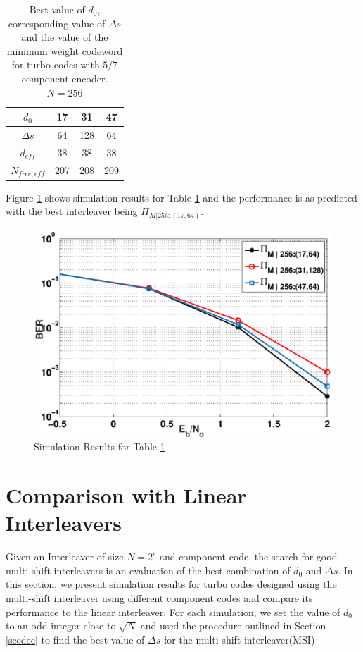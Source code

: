 \documentclass[a4paper, 12pt, oneside, openary]{jbook}
\begin{document}
 \begin{table}[h!]
\centering
\begin{tabular}{||c |c |c |c||} 
 \hline
 $d_0$ & 17 & 31 & 47 \\ [0.5ex] 
 \hline\hline
 $\Delta s$ & 64 & 128 & 64 \\ 
 \hline
  $d_{eff}$ & 38 & 38 & 38 \\ 
  \hline
  $N_{free, eff}$ & 207 & 208 & 209 \\ [1ex] 
 \hline
\end{tabular}
\caption{Best value of $d_0$,  corresponding value of $\Delta s$ 
and the value of the minimum weight codeword for
 turbo codes with $5/7$ component encoder. $N=256$}
\label{tab1}
\end{table}
Figure \ref{comp1} shows simulation results for Table 
 \ref{tab1} and the performance is as predicted with the best interleaver being $\Pi_{\mathit{M}|{256:(17,64)}}$.
\begin{figure}[h!]
\centering
		\includegraphics[width = \textwidth]{myInterleaver_(comparison_256)_5_7_3.eps}
		\caption{ Simulation Results for Table \ref{tab1}}
		\label{comp1}
		\end{figure}
		
\section{Comparison with Linear Interleavers}
Given an Interleaver of size $N=2^r$ and component code, the search for good
multi-shift interleavers is an evaluation of the best combination of $d_0$ and $\Delta s$.
 In this section, we present simulation 
results
for turbo codes designed using the multi-shift interleaver using different component
codes and compare its performance to the linear interleaver. For each simulation, 
we set the value of $d_0$ to an odd integer close to $\sqrt{N}$
and used the procedure outlined in Section \ref{secdec} to find the best value
of $\Delta s$ for the multi-shift interleaver(MSI)
\end{document}
